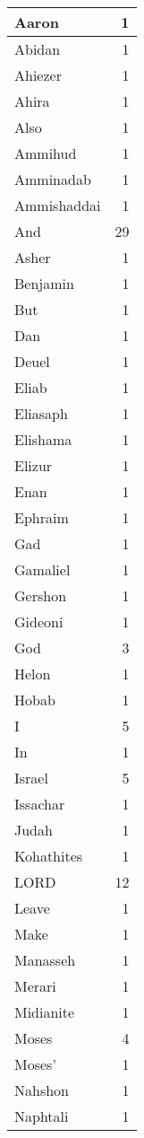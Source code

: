 \begin{center}
\begin{longtable}{l|r}
\hline \hline
\endlastfoot
Aaron & 1 \\ \hline
Abidan & 1 \\ \hline
Ahiezer & 1 \\ \hline
Ahira & 1 \\ \hline
Also & 1 \\ \hline
Ammihud & 1 \\ \hline
Amminadab & 1 \\ \hline
Ammishaddai & 1 \\ \hline
And & 29 \\ \hline
Asher & 1 \\ \hline
Benjamin & 1 \\ \hline
But & 1 \\ \hline
Dan & 1 \\ \hline
Deuel & 1 \\ \hline
Eliab & 1 \\ \hline
Eliasaph & 1 \\ \hline
Elishama & 1 \\ \hline
Elizur & 1 \\ \hline
Enan & 1 \\ \hline
Ephraim & 1 \\ \hline
Gad & 1 \\ \hline
Gamaliel & 1 \\ \hline
Gershon & 1 \\ \hline
Gideoni & 1 \\ \hline
God & 3 \\ \hline
Helon & 1 \\ \hline
Hobab & 1 \\ \hline
I & 5 \\ \hline
In & 1 \\ \hline
Israel & 5 \\ \hline
Issachar & 1 \\ \hline
Judah & 1 \\ \hline
Kohathites & 1 \\ \hline
LORD & 12 \\ \hline
Leave & 1 \\ \hline
Make & 1 \\ \hline
Manasseh & 1 \\ \hline
Merari & 1 \\ \hline
Midianite & 1 \\ \hline
Moses & 4 \\ \hline
Moses' & 1 \\ \hline
Nahshon & 1 \\ \hline
Naphtali & 1 \\ \hline

\end{longtable}
\end{center}
